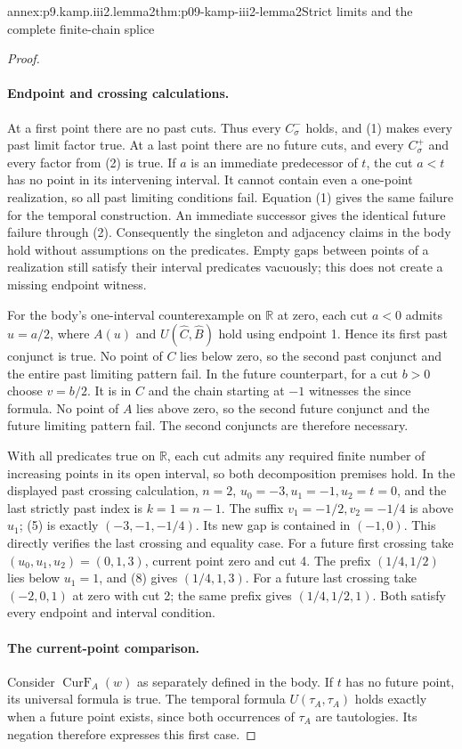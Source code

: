 \begin{annexitem}{annex:p9.kamp.iii2.lemma2}{thm:p09-kamp-iii2-lemma2}{Strict limits and the complete finite-chain splice}
\begin{proof}
\paragraph{Endpoint and crossing calculations.}
At a first point there are no past cuts.  Thus every \(C^-_\sigma\)
holds, and (1) makes every past limit factor true.  At a last point there
are no future cuts, and every \(C^+_\sigma\) and every factor from (2)
is true.  If \(a\) is an immediate predecessor of \(t\), the cut
\(a<t\) has no point in its intervening interval.  It cannot contain
even a one-point realization, so all past limiting conditions fail.
Equation (1) gives the same failure for the temporal construction.  An
immediate successor gives the identical future failure through (2).
Consequently the singleton and adjacency claims in the body hold without
assumptions on the predicates.  Empty gaps between points of a realization
still satisfy their interval predicates vacuously; this does not create a
missing endpoint witness.

For the body's one-interval counterexample on \(\mathbb R\) at zero,
each cut \(a<0\) admits \(u=a/2\), where \(A(u)\) and
\(U(\widehat C,\widehat B)\) hold using endpoint 1.  Hence its first
past conjunct is true.  No point of \(C\) lies below zero, so the second
past conjunct and the entire past limiting pattern fail.  In the future
counterpart, for a cut \(b>0\) choose \(v=b/2\).  It is in \(C\)
and the chain starting at \(-1\) witnesses the since formula.  No point
of \(A\) lies above zero, so the second future conjunct and the future
limiting pattern fail.  The second conjuncts are therefore necessary.

With all predicates true on \(\mathbb R\), each cut admits any required
finite number of increasing points in its open interval, so both
decomposition premises hold.  In the displayed past crossing calculation,
\(n=2\), \(u_0=-3,u_1=-1,u_2=t=0\), and the last strictly past
index is \(k=1=n-1\).  The suffix \(v_1=-1/2,v_2=-1/4\) is above
\(u_1\); (5) is exactly \((-3,-1,-1/4)\).  Its new gap is contained
in \((-1,0)\).  This directly verifies the last crossing and equality case.
For a future first crossing take \((u_0,u_1,u_2)=(0,1,3)\), current
point zero and cut 4.  The prefix \((1/4,1/2)\) lies below \(u_1=1\),
and (8) gives \((1/4,1,3)\).  For a future last crossing take
\((-2,0,1)\) at zero with cut 2; the same prefix gives
\((1/4,1/2,1)\).  Both satisfy every endpoint and interval condition.

\paragraph{The current-point comparison.}
Consider \(\operatorname{CurF}_A(w)\) as separately
defined in the body.  If \(t\) has no future point, its universal formula
is true.  The temporal formula \(U(\tau_A,\tau_A)\) holds exactly
when a future point exists, since both occurrences of \(\tau_A\) are
tautologies.  Its negation therefore expresses this first case.


\end{proof}
\end{annexitem}
